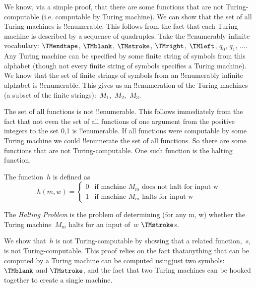 \documentclass[../../include/open-logic-section]{subfiles}
\begin{document}

\begin{explain}
We know, via a simple proof, that there are some functions that are not
Turing-computable (i.e. computable by Turing machine).
We can show that the set of all Turing-machines is !!{enumerable}. This
follows from the fact that each Turing machine is described by a sequence
of quadruples. Take the !!{enumerably} infinite vocabulary: $\TMendtape$,
$\TMblank$, $\TMstroke$, $\TMright$, $\TMleft$, $q_0$,
$q_1$, .... Any Turing machine
can be specified by some finite string of symbols from this alphabet
(though not every finite string of symbols specifies a Turing machine). We
know that the set of finite strings of symbols from an !!{enumerably} infinite
alphabet is !!{enumerable}. This gives us an !!{enumeration} of the Turing
machines (a subset of the finite strings):~$M_1$,~$M_2$,~$M_3$.

The set of all functions is not !!{enumerable}. This follows immediately from
the fact that not even the set of all functions of one argument from the
positive integers to the set {0,1} is !!{enumerable}.
If all functions were computable by some Turing machine we could !!{enumerate}
the set of all functions. So there are some functions that are not
Turing-computable. One such function is the halting function.
\end{explain}

\begin{defn} The function~$h$ is defined as
\[
h(m,w) =
\begin{cases}
  \text{0} & \text{if machine~$M_m$ does not halt for input w} \\
  \text{1} & \text{if machine~$M_m$ halts for input w}
\end{cases}
\]
\end{defn}

\begin{defn}
The \emph{Halting Problem} is the problem of determining (for any m, w)
whether the Turing machine~$M_m$ halts for an input of~$w$ $\TMstroke$s.
\end{defn}

\begin{explain}
We show that~$h$ is not Turing-computable by showing that a related
function,~$s$, is not Turing-computable. This proof relies on the fact
thatanything that can be computed by a Turing machine can be computed
usingjust two symbols: $\TMblank$ and $\TMstroke$, and the fact that two
Turing machines can be hooked together to create a single machine.
\end{explain}
\end{document}
